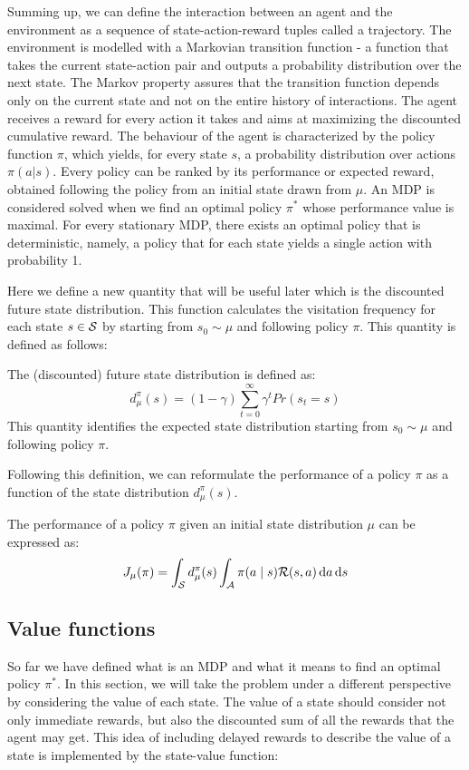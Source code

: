 Summing up, we can define the interaction between an agent and the environment as a sequence of state-action-reward tuples called a trajectory. The environment is modelled with a Markovian transition function - a function that takes the current state-action pair and outputs a probability distribution over the next state. The Markov property assures that the transition function depends only on the current state and not on the entire history of interactions. The agent receives a reward for every action it takes and aims at maximizing the discounted cumulative reward. The behaviour of the agent is characterized by the policy function $\pi$, which yields, for every state $s$, a probability distribution over actions $\pi(a|s)$. Every policy can be ranked by its performance or expected reward, obtained following the policy from an initial state drawn from $\mu$. An MDP is considered solved when we find an optimal policy $\pi^*$ whose performance value is maximal. For every stationary MDP, there exists an optimal policy that is deterministic, namely, a policy that for each state yields a single action with probability 1.

Here we define a new quantity that will be useful later which is the discounted future state distribution. This function calculates the visitation frequency for each state $s\in\mathcal{S}$ by starting from $s_0\sim\mu$ and following policy $\pi$. This quantity is defined as follows:
\begin{definition}
The (discounted) future state distribution is defined as: 
\[
d_{\mu}^{\pi}(s) = (1-\gamma)\sum_{t=0}^{\infty} \gamma^t Pr(s_t = s)
\]
This quantity identifies the expected state distribution starting from $s_0 \sim \mu$ and following policy $\pi$. 
\end{definition}

Following this definition, we can reformulate the performance of a policy $\pi$ as a function of the state distribution $d_\mu^\pi(s)$.

\begin{definition}
The performance of a policy $\pi$ given an initial state distribution $\mu$ can be expressed as: 
\begin{equation*}
J_{\mu}(\pi) = \int_{\mathcal{S}} d_{\mu}^{\pi}(s) \int_{\mathcal{A}} \pi(a \mid s) \mathcal{R}(s,a) \, \textrm{d} a \, \textrm{d} s
\end{equation*}
\end{definition}


\subsection{Value functions}
So far we have defined what is an MDP and what it means to find an optimal policy $\pi^*$. In this section, we will take the problem under a different perspective by considering the value of each state. The value of a state should consider not only immediate rewards, but also the discounted sum of all the rewards that the agent may get. This idea of including delayed rewards to describe the value of a state is implemented by the state-value function:

